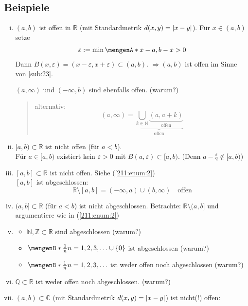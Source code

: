 \subsection[Beispiele für offene und abgeschlossene Mengen]{Beispiele} %
\label{sub:211}
\begin{enumerate}[(i)]
	\item $(a,b)$ ist offen in $\mathds{R}$ (mit Standardmetrik $d(x,y)= \abs*{x-y} $). Für $x \in (a,b)$ setze 
	\[
		\varepsilon := \min \set{x-a, b-x} >0
	\] 
	Dann $B(x, \varepsilon)= (x-\varepsilon, x+\varepsilon) \subset (a,b)$. $\Rightarrow (a,b)$ ist offen im Sinne von \ref{sub:23}.
	
	$(a,\infty)$ und $(- \infty, b)$ sind ebenfalls offen. \hfill (warum?)
	\begin{quote}
		alternativ: 
		\[
			(a, \infty) = \underbrace{\bigcup_{k \in \mathds{N}} \underbrace{(a, a+k)}_{\text{offen}}}_{\text{offen}}
		\]
	\end{quote}
	\item \label{211:enum:2}$[a,b) \subset \mathds{R}$ ist nicht offen (für $a<b$). \\
	Für $a \in [a,b)$ existiert kein $\varepsilon>0$ mit $B(a,\varepsilon) \subset [a,b)$. (Denn $a- \frac{\varepsilon}{2} \not\in [a,b)$)
	\item $[a,b] \subset \mathds{R}$ ist nicht offen. Siehe (\ref{211:enum:2}) \\
	$[a,b]$ ist abgeschlossen:
	\[
		\mathds{R} \setminus [a,b] = (- \infty, a) \cup (b, \infty) \quad \text{offen}
	\]
	\item $(a,b] \subset \mathds{R}$ (für $a<b$) ist nicht abgeschlossen. Betrachte: $\mathds{R} \setminus (a,b]$ und argumentiere wie in (\ref{211:enum:2})
	\item 
	\begin{itemize}
		\item $\mathds{N}, \mathds{Z} \subset \mathds{R}$ sind abgeschlossen \hfill (warum?)
		\item $\set[\frac{1}{n} ]{n=1,2,3, \ldots } \cup \{0\} $ ist abgeschlossen \hfill (warum?)
		\item $\set[\frac{1}{n} ]{n=1,2,3, \ldots }$ ist weder offen  noch abgeschlossen \hfill (warum?)
	\end{itemize}
	\item $\mathds{Q} \subset \mathds{R}$ ist weder offen noch abgeschlossen. \hfill (warum?)
	\item \label{211:enum:komplex}$(a,b) \subset \mathds{C}$ (mit Standardmetrik $d(x,y)= \abs*{x-y}$) ist nicht(!) offen:

\end{enumerate}
